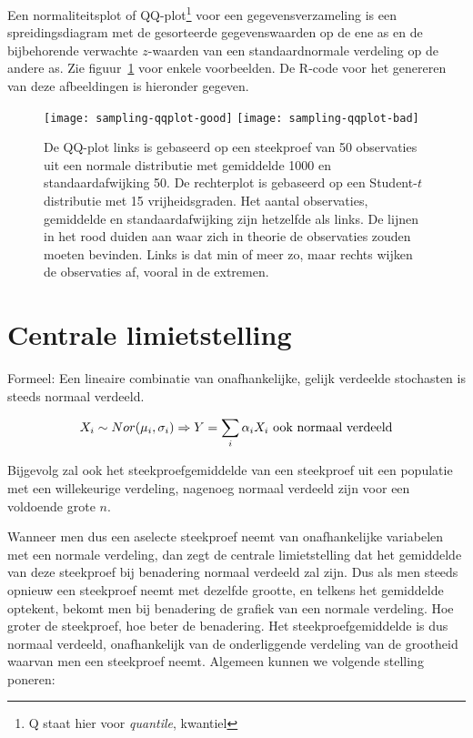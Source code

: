 \begin{definition}
  \label{def:qq-plot}
  Een normaliteitsplot of QQ-plot\footnote{Q staat hier voor \emph{quantile}, kwantiel} voor een gegevens\-verzameling is een spreidingsdiagram met de gesorteerde gegevenswaarden op de ene as en de bijbehorende verwachte $z$-waarden van een standaardnormale verdeling op de andere as. Zie figuur~\ref{fig:qqplot} voor enkele voorbeelden. De R-code voor het genereren van deze afbeeldingen is hieronder gegeven.
\end{definition}

\begin{figure}
  \begin{center}
    \texttt{[image: sampling-qqplot-good]}
    \texttt{[image: sampling-qqplot-bad]}
  \end{center}
  \caption{De QQ-plot links is gebaseerd op een steekproef van 50 observaties uit een normale distributie met gemiddelde 1000 en standaardafwijking 50. De rechterplot is gebaseerd op een Student-$t$ distributie met 15 vrijheidsgraden. Het aantal observaties, gemiddelde en standaardafwijking zijn hetzelfde als links.
    De lijnen in het rood duiden aan waar zich in theorie de observaties zouden moeten bevinden. Links is dat min of meer zo, maar rechts wijken de observaties af, vooral in de extremen.}
  \label{fig:qqplot}
\end{figure}



\section{Centrale limietstelling}
\label{sec:centrale-limietstelling}

\begin{definition}
Formeel: Een lineaire combinatie van onafhankelijke, gelijk verdeelde stochasten is steeds normaal verdeeld.

\[X_{i} \sim Nor(\mu_{i}, \sigma_{i}) \Rightarrow Y = \sum_{i} \alpha_{i} X_{i} \textnormal{ ook normaal verdeeld} \]

Bijgevolg zal ook het steekproefgemiddelde van een steekproef uit een populatie met een willekeurige verdeling, nagenoeg normaal verdeeld zijn voor een voldoende grote $n$.
\end{definition}

Wanneer men dus een aselecte steekproef neemt van onafhankelijke variabelen met een normale verdeling, dan zegt de centrale limietstelling dat het gemiddelde van deze steekproef bij benadering normaal verdeeld zal zijn. Dus als men steeds opnieuw een steekproef neemt met dezelfde grootte, en telkens het gemiddelde optekent, bekomt men bij benadering de grafiek van een normale verdeling. Hoe groter de steekproef, hoe beter de benadering. Het steekproefgemiddelde is dus normaal verdeeld, onafhankelijk van de onderliggende verdeling van de grootheid waarvan men een steekproef neemt. Algemeen kunnen we volgende stelling poneren:

